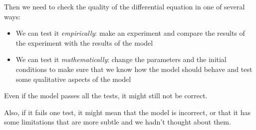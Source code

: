 Then we need to check the quality of the differential equation in one of several ways:
\begin{itemize}
	\item We can test it \emph{empirically}: make an experiment and compare the results of the experiment with the results of the model
	\item We can test it \emph{mathematically}: change the parameters and the initial conditions to make sure that we know how the model should behave and test some qualitative aspects of the model
\end{itemize}

\begin{important}
Even if the model passes all the tests, it might still not be correct.

Also, if it fails one test, it might mean that the model is incorrect, or that it has some limitations that are more subtle and we hadn't thought about them.	
\end{important}

